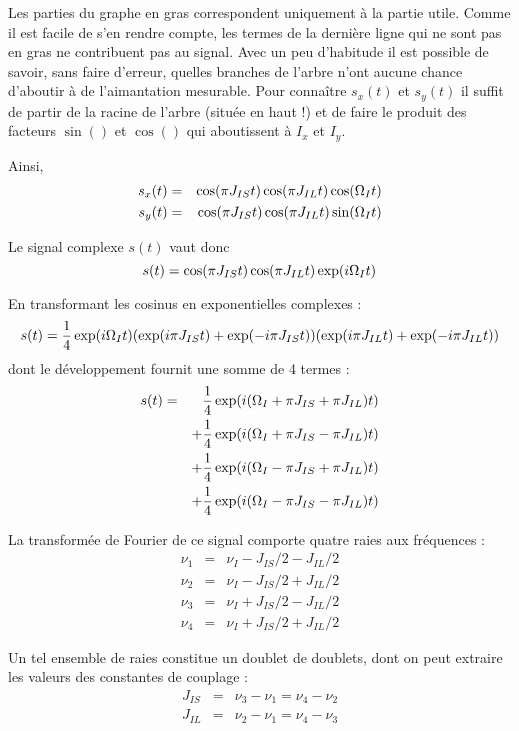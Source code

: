 Les parties du graphe en gras correspondent uniquement
à la partie utile.
Comme il est facile de s'en rendre compte, les termes de la
dernière ligne qui ne sont pas en gras ne contribuent pas
au signal.
Avec un peu d'habitude il est possible de savoir,
sans faire d'erreur, quelles branches de l'arbre n'ont
aucune chance d'aboutir à de l'aimantation mesurable.
Pour connaître $s_x(t)$ et $s_y(t)$ il suffit de partir de
la racine de l'arbre (située en haut !) et de faire le
produit des facteurs $\sin()$ et $\cos()$ qui aboutissent à
$I_x$ et $I_y$.

Ainsi,
\begin{eqnarray}
s_x(t) & = & \cos( \pi J_{IS} t) \cos(\pi J_{IL} t) \cos(\Omega_I t) \\
s_y(t) & = & \cos( \pi J_{IS} t) \cos(\pi J_{IL} t) \sin(\Omega_I t)
\end{eqnarray}

Le signal complexe $s(t)$ vaut donc
\begin{equation}
s(t) = \cos( \pi J_{IS} t) \cos(\pi J_{IL} t) \exp(i \Omega_I t)
\end{equation}

En transformant les cosinus en exponentielles complexes :
\begin{equation}
s(t) = \frac{1}{4}\exp(i \Omega_I t)
(\exp(i \pi J_{IS} t) + \exp(-i \pi J_{IS} t))
(\exp(i \pi J_{IL} t) + \exp(-i \pi J_{IL} t))
\end{equation}
dont le développement fournit une somme de 4 termes :
\begin{eqnarray}
s(t) & = & \frac{1}{4} \exp(i (\Omega_I + \pi J_{IS} + \pi J_{IL}) t) \\
& & + \frac{1}{4} \exp(i (\Omega_I + \pi J_{IS} - \pi J_{IL}) t) \\
& & + \frac{1}{4} \exp(i (\Omega_I - \pi J_{IS} + \pi J_{IL}) t) \\
& & + \frac{1}{4} \exp(i (\Omega_I - \pi J_{IS} - \pi J_{IL}) t)
\end{eqnarray}

La transformée de Fourier de ce signal comporte quatre raies aux fréquences :
\begin{eqnarray}
\nu_1 & = & \nu_I - J_{IS}/2 - J_{IL}/2 \\
\nu_2 & = & \nu_I - J_{IS}/2 + J_{IL}/2 \\
\nu_3 & = & \nu_I + J_{IS}/2 - J_{IL}/2 \\
\nu_4 & = & \nu_I + J_{IS}/2 + J_{IL}/2
\end{eqnarray}

Un tel ensemble de raies constitue un doublet de doublets, dont on peut
extraire les valeurs des constantes de couplage :
\begin{eqnarray}
J_{IS} & = & \nu_3 - \nu_1 = \nu_4 - \nu_2 \\
J_{IL} & = & \nu_2 - \nu_1 = \nu_4 - \nu_3
\end{eqnarray}

